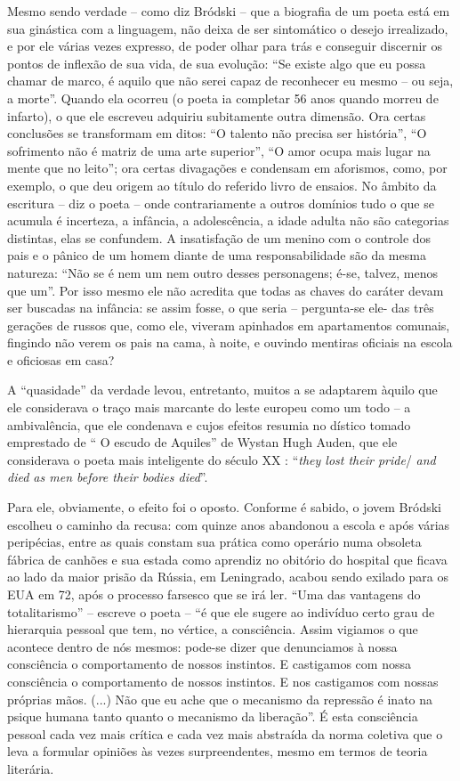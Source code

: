 Mesmo sendo verdade -- como diz Bródski -- que a biografia de um poeta
está em sua ginástica com a linguagem, não deixa de ser sintomático o
desejo irrealizado, e por ele várias vezes expresso, de poder olhar para
trás e conseguir discernir os pontos de inflexão de sua vida, de sua
evolução: ``Se existe algo que eu possa chamar de marco, é aquilo que
não serei capaz de reconhecer eu mesmo -- ou seja, a morte''. Quando ela
ocorreu (o poeta ia completar 56 anos quando morreu de infarto), o que
ele escreveu adquiriu subitamente outra dimensão. Ora certas conclusões
se transformam em ditos: ``O talento não precisa ser história'', ``O
sofrimento não é matriz de uma arte superior'', ``O amor ocupa mais
lugar na mente que no leito''; ora certas divagações e condensam em
aforismos, como, por exemplo, o que deu origem ao título do referido
livro de ensaios. No âmbito da escritura -- diz o poeta -- onde
contrariamente a outros domínios tudo o que se acumula é incerteza, a
infância, a adolescência, a idade adulta não são categorias distintas,
elas se confundem. A insatisfação de um menino com o controle dos pais e
o pânico de um homem diante de uma responsabilidade são da mesma
natureza: ``Não se é nem um nem outro desses personagens; é-se, talvez,
menos que um''. Por isso mesmo ele não acredita que todas as chaves do
caráter devam ser buscadas na infância: se assim fosse, o que seria --
pergunta-se ele- das três gerações de russos que, como ele, viveram
apinhados em apartamentos comunais, fingindo não verem os pais na cama,
à noite, e ouvindo mentiras oficiais na escola e oficiosas em casa?

A ``quasidade'' da verdade levou, entretanto, muitos a se adaptarem
àquilo que ele considerava o traço mais marcante do leste europeu como
um todo -- a ambivalência, que ele condenava e cujos efeitos resumia no
dístico tomado emprestado de `` O escudo de Aquiles'' de Wystan Hugh
Auden, que ele considerava o poeta mais inteligente do século XX :
``\emph{they lost their pride}/ \emph{and died as men before their
bodies died}''.

Para ele, obviamente, o efeito foi o oposto. Conforme é sabido, o jovem
Bródski escolheu o caminho da recusa: com quinze anos abandonou a escola
e após várias peripécias, entre as quais constam sua prática como
operário numa obsoleta fábrica de canhões e sua estada como aprendiz no
obitório do hospital que ficava ao lado da maior prisão da Rússia, em
Leningrado, acabou sendo exilado para os EUA em 72, após o processo
farsesco que se irá ler. ``Uma das vantagens do totalitarismo'' --
escreve o poeta -- ``é que ele sugere ao indivíduo certo grau de
hierarquia pessoal que tem, no vértice, a consciência. Assim vigiamos o
que acontece dentro de nós mesmos: pode-se dizer que denunciamos à nossa
consciência o comportamento de nossos instintos. E castigamos com nossa
consciência o comportamento de nossos instintos. E nos castigamos com
nossas próprias mãos. (...) Não que eu ache que o mecanismo da repressão
é inato na psique humana tanto quanto o mecanismo da liberação''. É esta
consciência pessoal cada vez mais crítica e cada vez mais abstraída da
norma coletiva que o leva a formular opiniões às vezes surpreendentes,
mesmo em termos de teoria literária.

